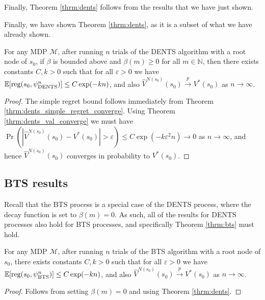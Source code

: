 \documentclass{article}
\newcommand{\bb}[1]{\mathbb{#1}}
\newcommand{\cl}[1]{\mathcal{#1}}
\newcommand{\Vt}[2]{\hat{V}^{#2}(#1)}
\newcommand{\reg}{\textnormal{reg}}
\newcommand{\rap}{\overset{p}{\to}}
\theoremstyle{plain}
\begin{document}
\begin{appendices}
        Finally, Theorem \ref{thrm:dents} follows from the results that we have just shown.
    
    
        Finally, we have shown Theorem \ref{thrm:dents}, as it is a subset of what we have already shown.
        \begin{customthm}{4.2}
            For any MDP $\cl{M}$, after running $n$ trials of the DENTS algorithm with a root node of $s_0$, if $\beta$ is bounded above and $\beta(m)\geq 0$ for all $m\in\bb{N}$, then there exists constants $C,k>0$ such that for all $\varepsilon>0$ we have 
            $\bb{E}[\reg(s_0,\psi^n_{\textnormal{DENTS}})] \leq C\exp(-kn)$, and also $\Vt{s_0}{N(s_0)} \rap V^*(s_0)$ as $n\rightarrow\infty$.
        \end{customthm}
        \begin{proof}
            The simple regret bound follows immediately from Theorem \ref{thrm:dents_simple_regret_converge}. Using Theorem \ref{thrm:dents_val_converge} we must have  $\Pr\left(\left| \Vt{s_{0}}{N(s_{0})} - V^*(s_0) \right| > \varepsilon \right) \leq C\exp\left( -k\varepsilon^2 n \right) \rightarrow 0$ as $n\rightarrow \infty$, and hence $\Vt{s_{0}}{N(s_{0})}$ converges in probability to $V^*(s_0)$.
        \end{proof}








    
    \subsection{BTS results} \label{appsec:bts_proofs}
    
        Recall that the BTS process is a special case of the DENTS process, where the decay function is set to $\beta(m)=0$. As such, all of the results for DENTS processes also hold for BTS processes, and specifically Theorem \ref{thrm:bts} must hold.

        
        \begin{customthm}{4.1}
            For any MDP $\cl{M}$, after running $n$ trials of the BTS algorithm with a root node of $s_0$, there exists constants $C,k>0$ such that for all $\varepsilon>0$ we have $\bb{E}[\reg(s_0,\psi^n_{\textnormal{BTS}})] \leq C\exp(-kn)$, and also $\Vt{s_0}{N(s_0)} \rap V^*(s_0)$ as $n\rightarrow\infty$.
        \end{customthm}
        \begin{proof}
            Follows from setting $\beta(m)=0$ and using Theorem \ref{thrm:dents}.
        \end{proof}












\end{appendices}
\end{document}
